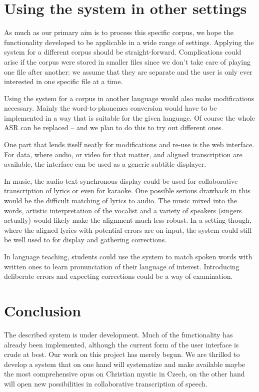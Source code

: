 \documentclass{llncs}
\begin{document}
\section{Using the system in other settings}

As much as our primary aim is to process this specific corpus, we hope the
functionality developed to be applicable in a wide range of settings. Applying
the system for a different corpus should be straight-forward. Complications
could arise if the corpus were stored in smaller files since we don't take care
of playing one file after another: we assume that they are separate and the user
is only ever interested in one specific file at a time.

Using the system for a corpus in another language would also make modifications
necessary. Mainly the word-to-phonemes conversion would have to be implemented
in a way that is suitable for the given language. Of course the whole ASR can be
replaced -- and we plan to do this to try out different ones.

One part that lends itself neatly for modifications and re-use is the web
interface. For data, where audio, or video for that matter, and aligned
transcription are available, the interface can be used as a generic subtitle
displayer.

In music, the audio-text synchronous display could be used for collaborative
transcription of lyrics or even for karaoke. One possible serious drawback in
this would be the difficult matching of lyrics to audio. The music mixed into
the words, artistic interpretation of the vocalist and a variety of speakers
(singers actually) would likely make the alignment much less robust. In a
setting though, where the aligned lyrics with potential errors are on input, the
system could still be well used to for display and gathering corrections.

In language teaching, students could use the system to match spoken words with
written ones to learn pronunciation of their language of interest. Introducing
deliberate errors and expecting corrections could be a way of examination.

\section{Conclusion}

The described system is under development. Much of the functionality
has already been implemented, although the current form of the user interface is
crude at best. Our work on this project has merely begun. We are thrilled to
develop a system that on one hand will systematize and make available maybe the
most comprehensive opus on Christian mystic in Czech, on the other hand will
open new possibilities in collaborative transcription of speech.
\end{document}
